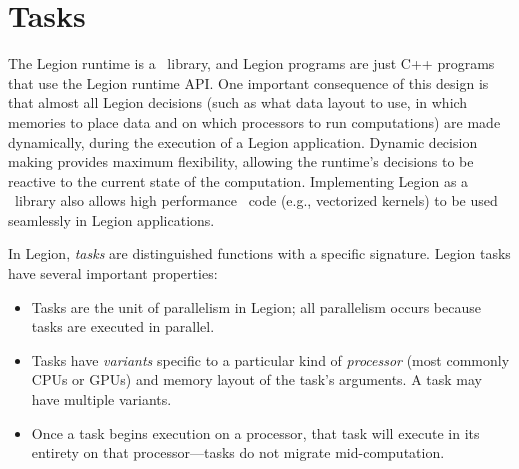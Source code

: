 \chapter{Tasks}
\label{chap:tasks}


The Legion runtime is a \Cpp\ library, and
Legion programs are just C++ programs that use the Legion runtime API.
One important consequence of this design is that almost all Legion decisions
(such as what data layout to use, in which memories to place data and on which
processors to run computations) are made dynamically,  during the execution of 
a Legion application.  Dynamic decision making provides maximum flexibility, 
allowing the runtime's decisions to be reactive to the current state of the computation.
Implementing Legion as a \Cpp\ library also allows high performance \Cpp\ code
(e.g., vectorized kernels) to be used seamlessly in Legion applications.

In Legion, {\em tasks} are distinguished functions with a specific signature.
Legion tasks have several important properties:
\begin{itemize}
\item Tasks are the unit of parallelism in Legion; all parallelism occurs because tasks are executed in parallel.

\item Tasks have {\em variants} specific to a particular kind of {\em processor} (most commonly CPUs or GPUs) and 
memory layout of the task's arguments.  A task may have multiple variants.

\item Once a task begins execution on a processor, that task will execute in its entirety on that processor---tasks do
not migrate mid-computation.  

\end{itemize}


